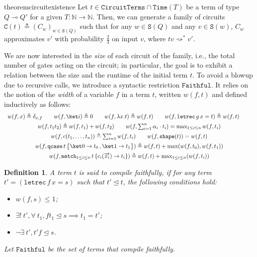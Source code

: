 \documentclass[10pt,a4paper]{article}
\newcommand{\linfunc}{\multimap}
\newcommand{\textqcase}{\ensuremath{\mathtt{qcase}}}
\newcommand{\textmatch}{\ensuremath{\mathtt{match}}}
\newcommand{\textletrec}{\ensuremath{\mathtt{letrec}}}
\newcommand{\zket}{\ket 0}
\newcommand{\oket}{\ket 1}
\newcommand{\qcasebase}[2]{
  \textqcase\,#1\left\{\! \begin{aligned} #2 \end{aligned}\right\}
}
\newcommand{\qcase}[3]{
  \qcasebase {#1} {\zket \to #2\,, \oket \to #3}
}
\newcommand{\qcasedefault}[1]{\ensuremath{\qcase{#1}{t_0}{t_1}}}
\newcommand{\matchdefaultcollapsedany}[2]{
  \textmatch_{1 \leq i \leq n}\,#1\,\{
    c_i(\overrightarrow{x_i}) \to #2_i
  \}
}
\newcommand{\matchdefaultcollapsed}[1]{\matchdefaultcollapsedany{#1}{t}}
\newcommand{\lbd}[2]{\lambda #1 .#2}
\newcommand{\letrec}[3]{\textletrec\,#1\,#2=#3}
\newcommand{\shape}[1]{\mathtt{shape}(#1)}
\newcommand{\subtermeq}{\trianglelefteq}
\newcommand{\reduces}{\rightsquigarrow}
\newcommand{\sreduces}{\reduces^*}
\newcommand{\circuittype}{\ensuremath{\mathtt{CircuitTerms}}}
\newcommand{\boundedrec}{\ensuremath{\mathtt{Faithful}}}
\newcommand{\shapeset}[1]{\mathtt{S}(#1)}
\newcommand{\famcirc}{\mathtt{C}(t)}
\newcommand{\timeset}[1]{\mathtt{Time}(#1)}
\newcommand{\mbN}{\mathbb N}
\newtheorem{definition}[theorem]{Definition}
\begin{document}
\begin{restatable}{theorem}{circuitexistence}
  \label{thm:circuit-exist}
  Let $t \in \circuittype \cap \timeset T$ be a term of type $Q \linfunc Q'$
  for a given $T : \mbN \to \mbN$. 
  Then, we can generate a family of circuits $\famcirc \triangleq (C_w)_{w \in
  \shapeset Q}$ such that for any $w \in \shapeset Q$ and any $v \in \shapeset
  w$, $C_w$ approximates $v'$ with probability $\frac 2 3$ on input $v$, where
  $tv \sreduces v'$.
\end{restatable}

We are now interested in the \emph{size} of each circuit of the family, i.e.,
the total number of gates acting on the circuit; in particular, the goal is to
exhibit a relation between the size and the runtime of the initial term $t$. To
avoid a blowup due to recursive calls, we introduce a syntactic restriction
$\boundedrec$. It relies on the notion of the \emph{width} of a variable $f$ in
a term $t$, written $w(f, t)$ and defined inductively as follows:
\[
\begin{array}{c}
  w(f, x) \triangleq \delta_{x, f} 
  \qquad 
  w(f, \ket i) \triangleq 0 
  \qquad 
  w(f, \lbd x t) \triangleq w(f,t) \qquad
  w(f, \letrec g x t) \triangleq w(f, t) \qquad \\[1ex]
  w(f, t_1 t_2) \triangleq w(f, t_1) + w(f, t_2)
  \qquad 
  w(f, \sum_{i=1}^n \alpha_i \cdot t_i) = \max_{1 \leq i \leq n} w(f, t_i) \\[1ex]
  w(f, c(t_1, \dots, t_n))       \triangleq \sum_{i=1}^n w(f, t_i) 
  \qquad
  w(f, \shape t) = w(f, t) \\[1ex]
  w(f,\qcasedefault t) \triangleq w(f, t) + \max(w(f,t_0), w(f,t_1)) \\[1ex]
  w(f, \matchdefaultcollapsed t) \triangleq w(f, t) + \max_{1 \leq i \leq
  n} (w(f, t_i))
\end{array}
\]

\begin{definition}\label{def:brec}
  A term $t$ is said to \emph{compile faithfully}, if for any term $t'=(\letrec
  f x s)$ such that $t' \subtermeq t$, the following conditions hold:
  \begin{itemize}
    \item $w(f, s) \leq 1$;
    \item $\exists !\  t', \forall\ t_1, f t_1 \subtermeq s \implies t_1 = t'$;
    \item $\neg \exists\  t', t'f \subtermeq s$.
  \end{itemize}
  Let $\boundedrec$ be the set of terms that compile faithfully.
\end{definition}
\end{document}
